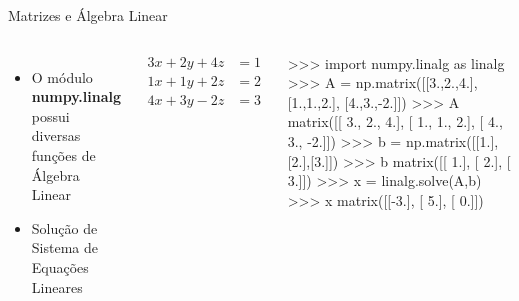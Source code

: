\documentclass[12pt,t,graphics]{beamer}
\begin{document}
\begin{frame}[t,fragile]{Matrizes e Álgebra Linear}
	\begin{columns}
		
		\begin{itemize}
			\item O módulo \textbf{numpy.linalg} possui diversas funções de Álgebra Linear
			\item Solução de Sistema de Equações Lineares
		\end{itemize}
		\begin{align*}
		3x + 2y + 4z &= 1\\
		1x + 1y + 2z &= 2\\
		4x + 3y - 2z &= 3
		\end{align*}
		\begin{python}
>>> import numpy.linalg as linalg
>>> A = np.matrix([[3.,2.,4.],
                   [1.,1.,2.],
                   [4.,3.,-2.]])
>>> A
matrix([[ 3.,  2.,  4.],
        [ 1.,  1.,  2.],
        [ 4.,  3., -2.]])
>>> b = np.matrix([[1.],[2.],[3.]])
>>> b
matrix([[ 1.],
        [ 2.],
        [ 3.]])
>>> x = linalg.solve(A,b)
>>> x
matrix([[-3.],
        [ 5.],
        [ 0.]])
		\end{python}
	\end{columns}
\end{frame}
\end{document}
